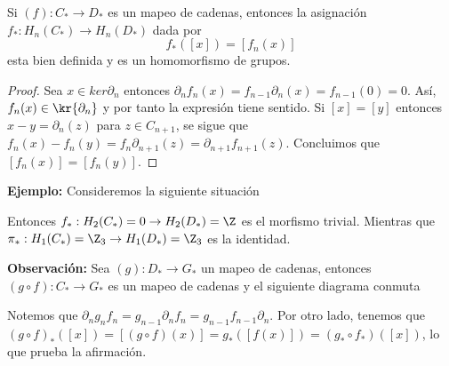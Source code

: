 \documentclass{article}
\begin{document}
\vspace{2mm}
\begin{lema}
    Si $(f):C_{*}\to D_{*}$ es un mapeo de cadenas, entonces la asignación 
    $f_{*}:H_{n}(C_{*})\to H_{n}(D_{*})$ dada por
    \begin{equation*}
        f_{*}([x])=[f_{n}(x)]
    \end{equation*}
    esta bien definida y es un homomorfismo de grupos.
\end{lema}
\begin{proof}
    Sea $x\in ker\partial_{n}$ entonces $\partial_{n}f_{n}(x)=f_{n-1}\partial_{n}(x)
    =f_{n-1}(0)=0$. Así, $f_{n}(x)\in\kr{\partial_{n}}$ y por tanto la expresión tiene sentido. Si
    $[x]=[y]$ entonces $x-y=\partial_{n}(z)$ para $z\in C_{n+1}$, se sigue que 
    $f_{n}(x)-f_{n}(y)=f_{n}\partial_{n+1}(z)=\partial_{n+1}f_{n+1}(z)$. Concluimos que 
    $[f_{n}(x)]=[f_{n}(y)]$.
\end{proof}

\noindent\textbf{Ejemplo:}
Consideremos la siguiente situación

\vspace{2mm}
\centerline{
}
\vspace{2mm}
\noindent Entonces $f_{*}:H_{2}(C_{*})=0\to H_{2}(D_{*})=\Z$ es el morfismo trivial. Mientras que
$\pi_{*}:H_{1}(C_{*})=\Z_{3}\to H_{1}(D_{*})=\Z_{3}$ es la identidad.

\vspace{2mm}
\noindent\textbf{Observación:} Sea $(g):D_{*}\to G_{*}$ un mapeo de cadenas, entonces 
$(g\circ f):C_{*}\to G_{*}$ es un mapeo de cadenas y el siguiente diagrama conmuta

\vspace{2mm}
\centerline{
}
\vspace{2mm}
\noindent Notemos que $\partial_{n}g_{n} f_{n}=g_{n-1}\partial_{n}f_{n}=g_{n-1}f_{n-1}
\partial_{n}$. Por otro lado, tenemos que $(g\circ f)_{*}([x])=[(g\circ f)(x)]=g_{*}([f(x)])=
(g_{*}\circ f_{*})([x])$, lo que prueba la afirmación.
\end{document}
